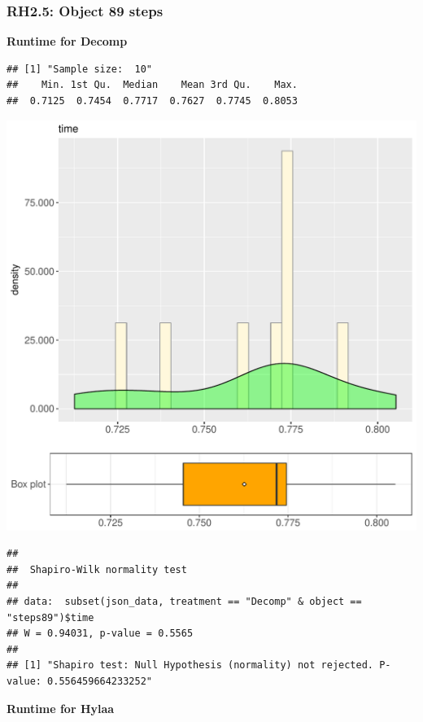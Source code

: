 \documentclass{article}\usepackage[]{graphicx}\usepackage[]{color}
\makeatletter
\def\maxwidth{ %
  \ifdim\Gin@nat@width>\linewidth
    \linewidth
  \else
    \Gin@nat@width
  \fi
}
\newenvironment{kframe}{%
 \def\at@end@of@kframe{}%
 \ifinner\ifhmode%
  \def\at@end@of@kframe{\end{minipage}}%
  \begin{minipage}{\columnwidth}%
 \fi\fi%
 \def\FrameCommand##1{\hskip\@totalleftmargin \hskip-\fboxsep
 \colorbox{shadecolor}{##1}\hskip-\fboxsep
     \hskip-\linewidth \hskip-\@totalleftmargin \hskip\columnwidth}%
 \MakeFramed {\advance\hsize-\width
   \@totalleftmargin\z@ \linewidth\hsize
   \@setminipage}}%
 {\par\unskip\endMakeFramed%
 \at@end@of@kframe}
\newenvironment{knitrout}{}{} %
\makeatother
\begin{document}
\subsubsection{RH2.5: Object 89 steps}

 \textbf{Runtime for Decomp}
\begin{knitrout}
\color{fgcolor}\begin{kframe}
\begin{verbatim}
## [1] "Sample size:  10"
##    Min. 1st Qu.  Median    Mean 3rd Qu.    Max. 
##  0.7125  0.7454  0.7717  0.7627  0.7745  0.8053
\end{verbatim}
\end{kframe}
\includegraphics[width=\maxwidth]{figure/RH2_Decomp_steps89-1} 
\begin{kframe}\begin{verbatim}
## 
## 	Shapiro-Wilk normality test
## 
## data:  subset(json_data, treatment == "Decomp" & object == "steps89")$time
## W = 0.94031, p-value = 0.5565
## 
## [1] "Shapiro test: Null Hypothesis (normality) not rejected. P-value: 0.556459664233252"
\end{verbatim}
\end{kframe}
\end{knitrout}
 \textbf{Runtime for Hylaa}
\end{document}
